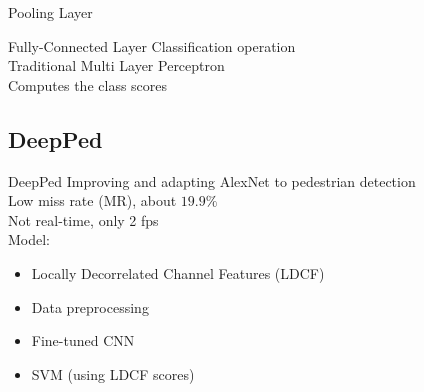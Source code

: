 \begin{frame}{Pooling Layer}
\end{frame}

\begin{frame}{Fully-Connected Layer}
  Classification operation\\
  \vspace{2mm}
  Traditional Multi Layer Perceptron\\
  \vspace{2mm}
  Computes the class scores\\
  \vspace{2mm}


\end{frame}
\subsection{DeepPed}
\begin{frame}{DeepPed}
  Improving and adapting AlexNet to pedestrian detection\\
  \vspace{2mm}
  Low miss rate (MR), about $19.9\%$\\
  \vspace{2mm}
  Not real-time, only 2 fps\\
  \vspace{2mm}
  Model:
  \begin{itemize}
    \item Locally Decorrelated Channel Features (LDCF)
    \item Data preprocessing
    \item Fine-tuned CNN
    \item SVM (using LDCF scores)
  \end{itemize}
\end{frame}

